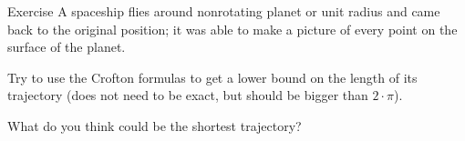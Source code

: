 \begin{thm}{Exercise}
A spaceship flies around nonrotating planet or unit radius and came back to the original position;
it was able to make a picture of every point on the surface of the planet.

Try to use the Crofton formulas to get a lower bound on the length of its trajectory (does not need to be exact, but should be bigger than $2\cdot\pi$).

What do you think could be the shortest trajectory?
\end{thm}

